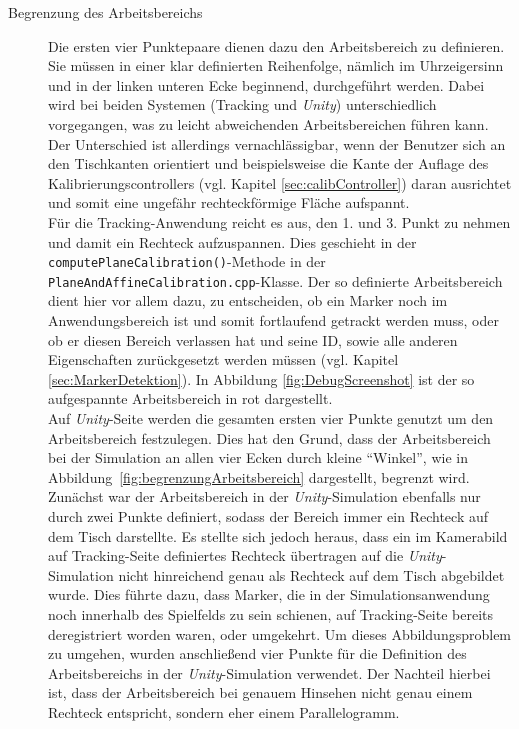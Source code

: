 \begin{description}
\item[Begrenzung des Arbeitsbereichs] Die ersten vier Punktepaare dienen dazu den Arbeitsbereich zu definieren. Sie müssen in einer klar definierten Reihenfolge, nämlich im Uhrzeigersinn und in der linken unteren Ecke beginnend, durchgeführt werden. Dabei wird bei beiden Systemen (Tracking und \emph{Unity}) unterschiedlich vorgegangen, was zu leicht abweichenden Arbeitsbereichen führen kann. Der Unterschied ist allerdings vernachlässigbar, wenn der Benutzer sich an den Tischkanten orientiert und beispielsweise die Kante der Auflage des Kalibrierungscontrollers (vgl. Kapitel \ref{sec:calibController}) daran ausrichtet und somit eine ungefähr rechteckförmige Fläche aufspannt. \\
Für die Tracking-Anwendung reicht es aus, den 1. und 3. Punkt zu nehmen und damit ein Rechteck aufzuspannen. Dies geschieht in der \texttt{compute\-Plane\-Cali\-bration()}-Methode in der \texttt{Plane\-And\-Affine\-Calibration.cpp}-Klasse. Der so definierte Arbeitsbereich dient hier vor allem dazu, zu entscheiden, ob ein Marker noch im Anwendungsbereich ist und somit fortlaufend getrackt werden muss, oder ob er diesen Bereich verlassen hat und seine ID, sowie alle anderen Eigenschaften zurückgesetzt werden müssen (vgl. Kapitel \ref{sec:MarkerDetektion}). In Abbildung \ref{fig:DebugScreenshot} ist der so aufgespannte Arbeitsbereich in rot dargestellt.\\
Auf \emph{Unity}-Seite werden die gesamten ersten vier Punkte genutzt um den Arbeitsbereich festzulegen. Dies hat den Grund, dass der Arbeitsbereich bei der Simulation an allen vier Ecken durch kleine "`Winkel"', wie in Abbildung~\ref{fig:begrenzungArbeitsbereich} dargestellt, begrenzt wird. Zunächst war der Arbeitsbereich in der \emph{Unity}-Simulation ebenfalls nur durch zwei Punkte definiert, sodass der Bereich immer ein Rechteck auf dem Tisch darstellte. Es stellte sich jedoch heraus, dass ein im Kamerabild auf Tracking-Seite definiertes Rechteck übertragen auf die \emph{Unity}-Simulation nicht hinreichend genau als Rechteck auf dem Tisch abgebildet wurde. Dies führte dazu, dass Marker, die in der Simulationsanwendung noch innerhalb des Spielfelds zu sein schienen, auf Tracking-Seite bereits deregistriert worden waren, oder umgekehrt. Um dieses Abbildungsproblem zu umgehen, wurden anschließend vier Punkte für die Definition des Arbeitsbereichs in der \emph{Unity}-Simulation verwendet. Der Nachteil hierbei ist, dass der Arbeitsbereich bei genauem Hinsehen nicht genau einem Rechteck entspricht, sondern eher einem Parallelogramm.


\end{description}
